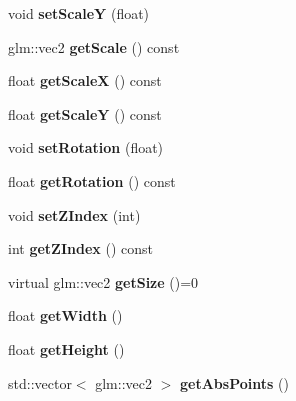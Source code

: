 \begin{DoxyCompactItemize}
void {\bfseries set\+ScaleY} (float)
\item 
\mbox{\label{classsage_1_1Node_af1a9bc0715acbc80623b5a15a5f65f3f}} 
glm\+::vec2 {\bfseries get\+Scale} () const
\item 
\mbox{\label{classsage_1_1Node_a27040ef8ab59ccf42b87d6ddc8d794e6}} 
float {\bfseries get\+ScaleX} () const
\item 
\mbox{\label{classsage_1_1Node_ab87661ab8940512baf2e7639ea55ff87}} 
float {\bfseries get\+ScaleY} () const
\item 
\mbox{\label{classsage_1_1Node_abebf06344504b38b251a4ba5d2326de0}} 
void {\bfseries set\+Rotation} (float)
\item 
\mbox{\label{classsage_1_1Node_aca7139bc3ea6705d41bb65a4fb7ddb6c}} 
float {\bfseries get\+Rotation} () const
\item 
\mbox{\label{classsage_1_1Node_a9f0f43f5259e439bdda7fb1851db3286}} 
void {\bfseries set\+Z\+Index} (int)
\item 
\mbox{\label{classsage_1_1Node_a8e9bb673c18c8637fb2bba6a0e2a8653}} 
int {\bfseries get\+Z\+Index} () const
\item 
\mbox{\label{classsage_1_1Node_a286d3b5b0d16d31991b58cab972fb03b}} 
virtual glm\+::vec2 {\bfseries get\+Size} ()=0
\item 
\mbox{\label{classsage_1_1Node_a65163ffabcfe9f482282ea37ead6fc5f}} 
float {\bfseries get\+Width} ()
\item 
\mbox{\label{classsage_1_1Node_a6af5a8378ac8d2c3490adbc2a03f1247}} 
float {\bfseries get\+Height} ()
\item 
\mbox{\label{classsage_1_1Node_af1dc65160a79ba86b10b08fd3eb28560}} 
std\+::vector$<$ glm\+::vec2 $>$ {\bfseries get\+Abs\+Points} ()
\end{DoxyCompactItemize}
